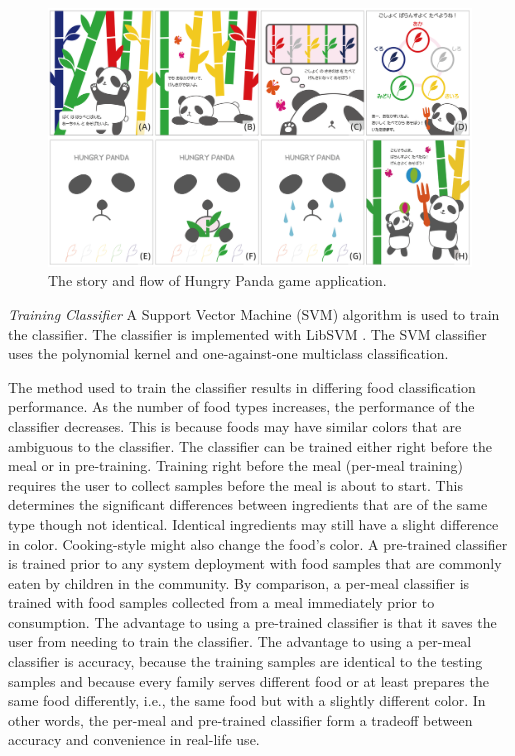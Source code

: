 \begin{figure}[!t]
\begin{center}
\includegraphics[width=15cm]{image/HP_app.png}
\caption{The story and flow of Hungry Panda game application.}
\label{panda}
\end{center}
\end{figure}

\textit{Training Classifier}
\newline
A Support Vector Machine (SVM) algorithm is used to train the classifier. 
The classifier is implemented with LibSVM \cite{Chang:2011}. 
The SVM classifier uses the polynomial kernel and one-against-one multiclass classification.

The method used to train the classifier results in differing food classification performance. 
As the number of food types increases, the performance of the classifier decreases. 
This is because foods may have similar colors that are ambiguous to the classifier. 
The classifier can be trained either right before the meal or in pre-training. 
Training right before the meal (per-meal training) requires the user to collect samples before the meal is about to start. 
This determines the significant differences between ingredients that are of the same type though not identical. 
Identical ingredients may still have a slight difference in color. Cooking-style might also change the food's color. 
A pre-trained classifier is trained prior to any system deployment with food samples 
that are commonly eaten by children in the community. 
By comparison, a per-meal classifier is trained with food samples collected from a meal immediately prior to consumption. 
The advantage to using a pre-trained classifier is that it saves the user from needing to train the classifier. 
The advantage to using a per-meal classifier is accuracy, 
because the training samples are identical to the testing samples 
and because every family serves different food or at least prepares the same food differently, 
i.e., the same food but with a slightly different color. 
In other words, the per-meal and pre-trained classifier form a tradeoff between accuracy and convenience in real-life use. 


